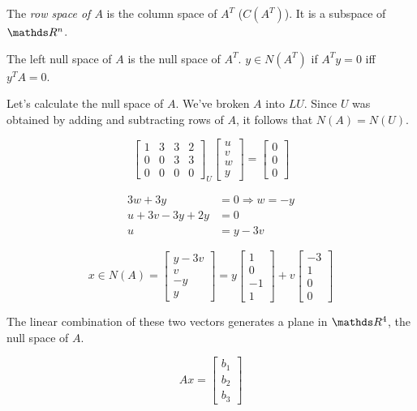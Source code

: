 The \textit{row space of $A$} is the column space of $A^T$ ($C(A^T)$). It is a subspace of $\bbR^n$.

The left null space of $A$ is the null space of $A^T$. $y \in N(A^T)$ if $A^Ty=0$ iff $y^T A = 0$.

Let's calculate the null space of $A$. We've broken $A$ into $LU$. Since $U$ was obtained by adding and subtracting rows of $A$, it follows that $N(A) = N(U)$.

\[
  \begin{bmatrix}
    1 & 3 & 3 & 2 \\
    0 & 0 & 3 & 3 \\
    0 & 0 & 0 & 0
  \end{bmatrix}_U 
  \begin{bmatrix}
    u \\ v \\ w \\y
  \end{bmatrix} = 
  \begin{bmatrix}
    0 \\ 0 \\0
  \end{bmatrix}
\]

\begin{align*}
  3w + 3y &= 0 \Rightarrow w = -y \\
  u + 3v - 3y + 2y &= 0 \\
  u &= y - 3v
\end{align*}

\[
  x \in N(A) = \begin{bmatrix}
    y - 3v \\ v \\ -y \\ y
  \end{bmatrix} = 
  y \begin{bmatrix}
    1 \\ 0 \\ -1 \\ 1
  \end{bmatrix} + 
  v \begin{bmatrix}
    -3 \\ 1 \\ 0 \\ 0
  \end{bmatrix}
\]

The linear combination of these two vectors generates a plane in $\bbR^4$, the null space of $A$.

\[
  Ax = \begin{bmatrix}
    b_1 \\ b_2 \\ b_3
  \end{bmatrix}
\]


